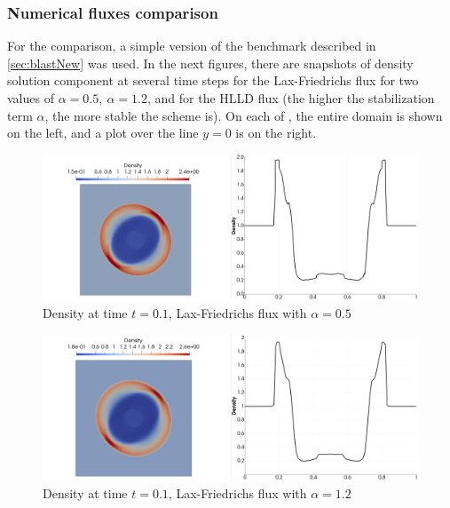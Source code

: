 \subsubsection{Numerical fluxes comparison}
\label{subsec:numfluxcomp}
For the comparison, a simple version of the benchmark described in \cref{sec:blastNew} was used. In the next figures, there are snapshots of density solution component at several time steps for the Lax-Friedrichs flux for two values of $\alpha = 0.5,\ \alpha=1.2$, and for the HLLD flux (the higher the stabilization term $\alpha$, the more stable the scheme is). On each of , the entire domain is shown on the left, and a plot over the line $y = 0$ is on the right.
	\begin{figure}[H]
		\begin{center}
			\includegraphics[width=\textwidth]{img/numflux/lf-05-0.jpg}
			\vspace{-3mm}
			\caption{Density at time $t = 0.1$, Lax-Friedrichs flux with $\alpha = 0.5$}
		\end{center}
		\label{numFluxCompare0}
	\end{figure}\vspace{-7mm}
	\begin{figure}[H]
		\begin{center}
			\includegraphics[width=\textwidth]{img/numflux/lf-10-0.jpg}
			\vspace{-3mm}
		\caption{Density at time $t = 0.1$, Lax-Friedrichs flux with $\alpha = 1.2$}
		\end{center}
		\label{numFluxCompare1}
	\end{figure}\vspace{-7mm}
